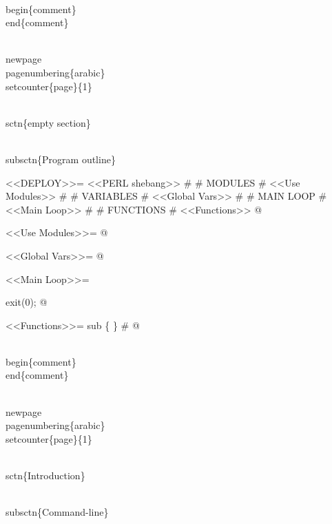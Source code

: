 \documentclass[11pt]{article}
\def\nwendcode{\endtrivlist \endgroup} %
\let\nwdocspar=\par                    %
\begin{document}
\\begin\{comment\}
\\end\{comment\}

\nwendcode{}\nwdocspar

\nwenddocs{}\endmoddef

\\newpage
\\pagenumbering\{arabic\}
\\setcounter\{page\}\{1\}

\\sctn\{empty section\}

\\subsctn\{Program outline\}

<<DEPLOY>>=
<<PERL shebang>>
#
# MODULES
#
<<Use Modules>>
#
# VARIABLES
#
<<Global Vars>>
#
# MAIN LOOP
#
<<Main Loop>>
#
# FUNCTIONS
#
<<Functions>>
@ 

<<Use Modules>>=
@

<<Global Vars>>=
@

<<Main Loop>>=

exit(0);
@

<<Functions>>=
sub \{
\} # 
@

\\begin\{comment\}
\\end\{comment\}

\nwendcode{}\nwdocspar

\nwenddocs{}\endmoddef

\\newpage
\\pagenumbering\{arabic\}
\\setcounter\{page\}\{1\}

\\sctn\{Introduction\}

\\subsctn\{Command-line\}
\end{document}
